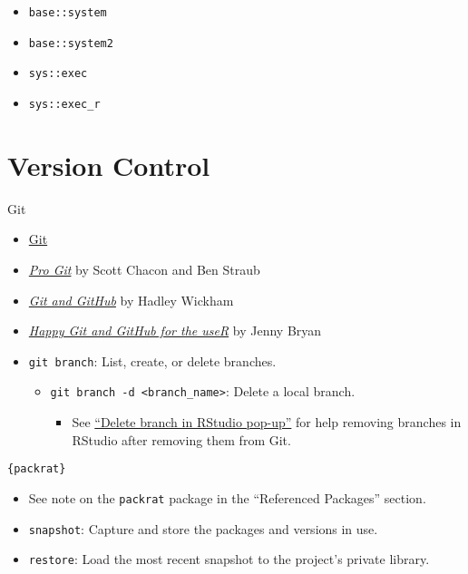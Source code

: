 \documentclass[
]{book}
\providecommand{\tightlist}{%
  \setlength{\itemsep}{0pt}\setlength{\parskip}{0pt}}
\begin{document}
\begin{itemize}
\tightlist
\item
  \texttt{base::system}
\item
  \texttt{base::system2}
\item
  \texttt{sys::exec}
\item
  \texttt{sys::exec\_r}
\end{itemize}

\hypertarget{version-control}{%
\section{Version Control}\label{version-control}}

Git

\begin{itemize}
\item
  \href{https://git-scm.com/}{Git}
\item
  \href{https://git-scm.com/book/en/v2}{\emph{Pro Git}} by Scott Chacon and Ben Straub
\item
  \href{http://r-pkgs.had.co.nz/git.html\#git-learning}{\emph{Git and GitHub}} by Hadley Wickham
\item
  \href{http://happygitwithr.com/}{\emph{Happy Git and GitHub for the useR}} by Jenny Bryan
\item
  \texttt{git\ branch}: List, create, or delete branches.

  \begin{itemize}
  \tightlist
  \item
    \texttt{git\ branch\ -d\ \textless{}branch\_name\textgreater{}}: Delete a local branch.

    \begin{itemize}
    \tightlist
    \item
      See \href{https://community.rstudio.com/t/delete-branch-in-rstudio-pop-up/15465}{``Delete branch in RStudio pop-up''} for help removing branches in RStudio after removing them from Git.
    \end{itemize}
  \end{itemize}
\end{itemize}

\texttt{\{packrat\}}

\begin{itemize}
\tightlist
\item
  See note on the \texttt{packrat} package in the ``Referenced Packages'' section.
\item
  \texttt{snapshot}: Capture and store the packages and versions in use.
\item
  \texttt{restore}: Load the most recent snapshot to the project's private library.
\end{itemize}
\end{document}

